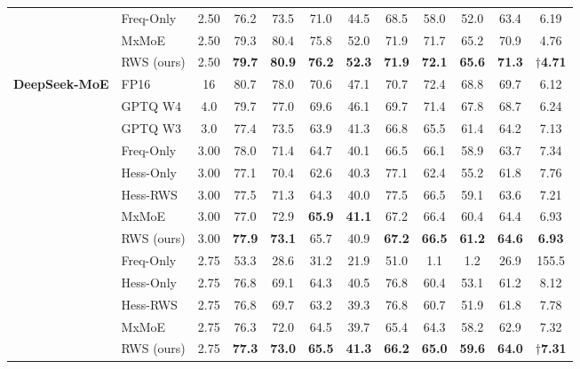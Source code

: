 \begin{table}[!t]
\begin{tabular}{llcccccccccc}
\cmidrule(lr){2-12}
                      & Freq-Only   & 2.50 & 76.2 & 73.5 & 71.0 & 44.5 & 68.5 & 58.0 & 52.0 & 63.4 &   6.19 \\
                      & MxMoE       & 2.50 & 79.3 & 80.4 & 75.8 & 52.0 & 71.9 & 71.7 & 65.2 & 70.9 &   4.76 \\
                      & RWS (ours)  & 2.50 & \textbf{79.7} & \textbf{80.9} & \textbf{76.2} & \textbf{52.3} & \textbf{71.9} & \textbf{72.1} & \textbf{65.6} & \textbf{71.3} & $\dagger$\textbf{4.71} \\
\midrule
\textbf{DeepSeek-MoE} & FP16    & 16   & 80.7 & 78.0 & 70.6 & 47.1 & 70.7 & 72.4 & 68.8 & 69.7 &  6.12 \\
                      & GPTQ W4 & 4.0  & 79.7 & 77.0 & 69.6 & 46.1 & 69.7 & 71.4 & 67.8 & 68.7 &  6.24 \\
                      & GPTQ W3 & 3.0  & 77.4 & 73.5 & 63.9 & 41.3 & 66.8 & 65.5 & 61.4 & 64.2 &  7.13 \\
\cmidrule(lr){2-12}
                      & Freq-Only   & 3.00 & 78.0 & 71.4 & 64.7 & 40.1 & 66.5 & 66.1 & 58.9 & 63.7 &   7.34 \\
                      & Hess-Only   & 3.00 & 77.1 & 70.4 & 62.6 & 40.3 & 77.1 & 62.4 & 55.2 & 61.8 &   7.76 \\
                      & Hess-RWS    & 3.00 & 77.5 & 71.3 & 64.3 & 40.0 & 77.5 & 66.5 & 59.1 & 63.6 &   7.21 \\
                      & MxMoE       & 3.00 & 77.0 & 72.9 & \textbf{65.9} & \textbf{41.1} & 67.2 & 66.4 & 60.4 & 64.4 &   6.93 \\
                      & RWS (ours)  & 3.00 & \textbf{77.9} & \textbf{73.1} & 65.7 & 40.9 & \textbf{67.2} & \textbf{66.5} & \textbf{61.2} & \textbf{64.6} &   \textbf{6.93} \\
\cmidrule(lr){2-12}
                      & Freq-Only   & 2.75 & 53.3 & 28.6 & 31.2 & 21.9 & 51.0 &  1.1 &  1.2 & 26.9 & 155.5 \\
                      & Hess-Only   & 2.75 & 76.8 & 69.1 & 64.3 & 40.5 & 76.8 & 60.4 & 53.1 & 61.2 &   8.12 \\
                      & Hess-RWS    & 2.75 & 76.8 & 69.7 & 63.2 & 39.3 & 76.8 & 60.7 & 51.9 & 61.8 &   7.78 \\
                      & MxMoE       & 2.75 & 76.3 & 72.0 & 64.5 & 39.7 & 65.4 & 64.3 & 58.2 & 62.9 &   7.32 \\
                      & RWS (ours)  & 2.75 & \textbf{77.3} & \textbf{73.0} & \textbf{65.5} & \textbf{41.3} & \textbf{66.2} & \textbf{65.0} & \textbf{59.6} & \textbf{64.0} & $\dagger$\textbf{7.31} \\

\end{tabular}
\end{table}
